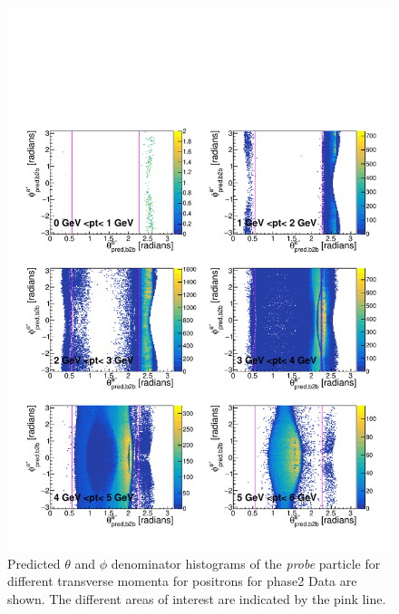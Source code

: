 \documentclass[a4paper,11pt,twosided,final,german,openbib,pdftex,listof=totoc,bibliography=totoc]{scrbook}
\begin{document}
\begin{appendix}
\begin{figure}[h!]
	\includegraphics[width=\textwidth]{Plots/master/RTPtMepD_Data.pdf}
	\caption[Denominator $\theta$-$\phi$ Positron Transverse Momentum Phase2 Data]{Predicted $\theta$ and $\phi$ denominator histograms of the \textit{probe} particle for different transverse momenta for positrons for phase2 Data are shown. The different areas of interest are indicated by the pink line.}
	\label{plt:RTtPMepD_Data}
\end{figure}



\end{appendix}
\end{document}
